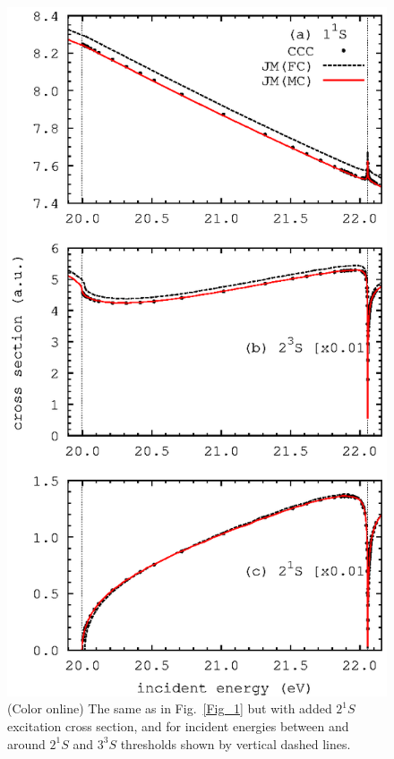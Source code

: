 \documentclass[aip
, pra
, showpacs
, aps
, twocolumn
, groupedaddress
, floatfix
]{revtex4}
\begin{document}
\begin{figure}[htb]
\includegraphics[scale=1]{fig2.ps}
\caption{(Color online) The same as in Fig.~\ref{Fig_1} but with added $2^1S$ excitation cross section, and
for incident energies between and around $2^1S$ and $3^3S$ thresholds shown by vertical dashed lines.
}
\label{Fig_2}
\end{figure}
\end{document}
